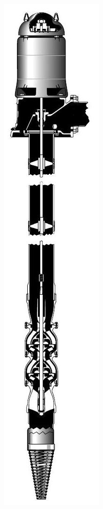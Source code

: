 \documentclass[10pt]{article}
\begin{document}
\includegraphics[max width=\textwidth]{VerticalTurbine}
\end{document}
